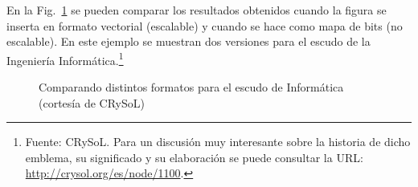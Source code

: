 \documentclass[11pt,a4paper]{article}
\begin{document}
En la Fig.~\ref{fig:escudo} se pueden comparar los resultados obtenidos cuando la figura se inserta en formato vectorial (escalable) y cuando se hace como mapa de bits (no escalable). En este ejemplo se muestran dos versiones para el escudo de la Ingeniería Informática.\footnote{Fuente: CRySoL. Para un discusión muy interesante sobre la historia de dicho emblema, su significado y su elaboración se puede consultar la URL: \url{http://crysol.org/es/node/1100}.}


\begin{figure}[htb]
	\centering
	\caption[Comparación PDF y png]{Comparando distintos formatos para el escudo de Informática (cortesía de CRySoL)}
	\label{fig:escudo}
\end{figure}
\end{document}
